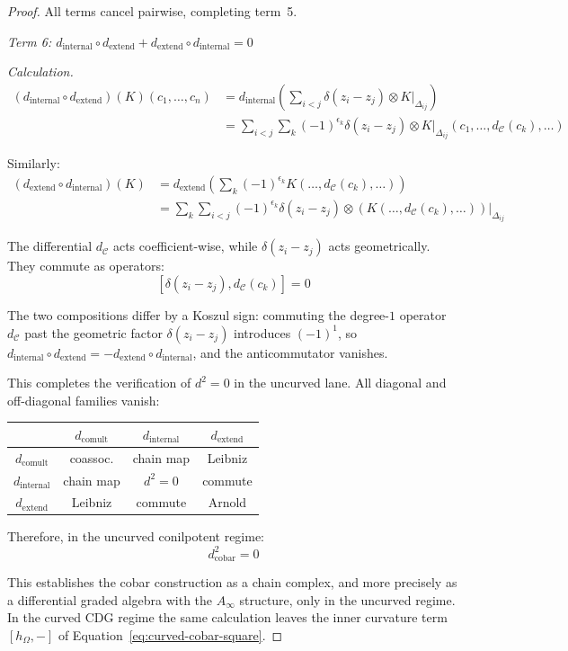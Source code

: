 \begin{proof}
All terms cancel pairwise, completing term~5.

\emph{Term 6: $d_{\text{internal}} \circ d_{\text{extend}} + d_{\text{extend}}
\circ d_{\text{internal}} = 0$}

\emph{Calculation.}
\begin{align*}
(d_{\text{internal}} \circ d_{\text{extend}})(K)(c_1, \ldots, c_n) &=
d_{\text{internal}}\left(\sum_{i<j} \delta(z_i - z_j) \otimes K|_{\Delta_{ij}}\right) \\
&= \sum_{i<j} \sum_k (-1)^{\epsilon_k} \delta(z_i - z_j) \otimes
K|_{\Delta_{ij}}(c_1, \ldots, d_{\mathcal{C}}(c_k), \ldots)
\end{align*}

Similarly:
\begin{align*}
(d_{\text{extend}} \circ d_{\text{internal}})(K) &= d_{\text{extend}}\left(\sum_k
(-1)^{\epsilon_k} K(\ldots, d_{\mathcal{C}}(c_k), \ldots)\right) \\
&= \sum_k \sum_{i<j} (-1)^{\epsilon_k} \delta(z_i - z_j) \otimes
(K(\ldots, d_{\mathcal{C}}(c_k), \ldots))|_{\Delta_{ij}}
\end{align*}

The differential $d_{\mathcal{C}}$ acts coefficient-wise,
while $\delta(z_i - z_j)$ acts geometrically. They commute as operators:
\[[\delta(z_i - z_j), d_{\mathcal{C}}(c_k)] = 0\]

The two compositions differ by a Koszul sign: commuting the degree-$1$ operator $d_{\mathcal{C}}$ past the geometric factor $\delta(z_i - z_j)$ introduces $(-1)^1$, so $d_{\mathrm{internal}} \circ d_{\mathrm{extend}} = -d_{\mathrm{extend}} \circ d_{\mathrm{internal}}$, and the anticommutator vanishes.

This completes the verification of $d^2 = 0$ in the uncurved lane. All
diagonal and off-diagonal families vanish:
\begin{center}
\begin{tabular}{c|ccc}
& $d_{\text{comult}}$ & $d_{\text{internal}}$ & $d_{\text{extend}}$ \\ \hline
$d_{\text{comult}}$ & coassoc. & chain map & Leibniz \\
$d_{\text{internal}}$ & chain map & $d^2=0$ & commute \\
$d_{\text{extend}}$ & Leibniz & commute & Arnold \\
\end{tabular}
\end{center}

Therefore, in the uncurved conilpotent regime:
\[d_{\text{cobar}}^2 = 0\]

This establishes the cobar construction as a chain complex, and more
precisely as a differential graded algebra with the $A_\infty$
structure, only in the uncurved regime. In the curved CDG regime the
same calculation leaves the inner curvature term
$[h_\Omega,-]$ of Equation~\eqref{eq:curved-cobar-square}.
\end{proof}

